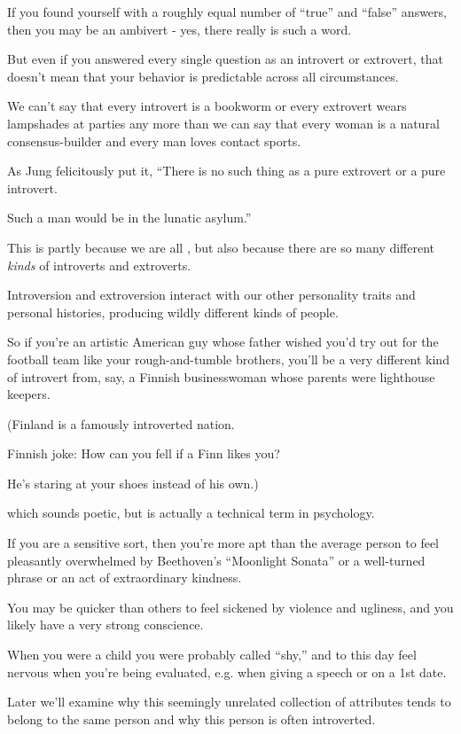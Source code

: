 \documentclass[oneside]{article}
\numberwithin{equation}{section}
\begin{document}
If you found yourself with a roughly equal number of ``true'' and ``false'' answers, then you may be an ambivert - yes, there really is such a word.

%
But even if you answered every single question as an introvert or extrovert, that doesn't mean that your behavior is predictable across all circumstances.

We can't say that every introvert is a bookworm or every extrovert wears lampshades at parties any more than we can say that every woman is a natural consensus-builder and every man loves contact sports.

As Jung felicitously put it, ``There is no such thing as a pure extrovert or a pure introvert.

Such a man would be in the lunatic asylum.''

%
This is partly because we are all , but also because there are so many different \textit{kinds} of introverts and extroverts.

Introversion and extroversion interact with our other personality traits and personal histories, producing wildly different kinds of people.

So if you're an artistic American guy whose father wished you'd try out for the football team like your rough-and-tumble brothers, you'll be a very different kind of introvert from, say, a Finnish businesswoman whose parents were lighthouse keepers.

(Finland is a famously introverted nation.

Finnish joke: How can you fell if a Finn likes you?

He's staring at your shoes instead of his own.)

%
 which sounds poetic, but is actually a technical term in psychology.

If you are a sensitive sort, then you're more apt than the average person to feel pleasantly overwhelmed by Beethoven's ``Moonlight Sonata'' or a well-turned phrase or an act of extraordinary kindness.

You may be quicker than others to feel sickened by violence and ugliness, and you likely have a very strong conscience.

When you were a child you were probably called ``shy,'' and to this day feel nervous when you're being evaluated, e.g. when giving a speech or on a 1st date.

Later we'll examine why this seemingly unrelated collection of attributes tends to belong to the same person and why this person is often introverted.
\end{document}
